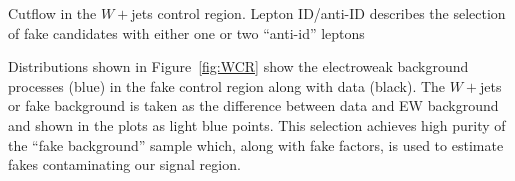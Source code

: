 \begin{table}[h!]
\scalebox{0.7}{

}
\caption{Cutflow in the $W+$jets control region. Lepton ID/anti-ID describes the selection of fake candidates with either one or two ``anti-id'' leptons}
\label{tab:fakescr}
\end{table}

Distributions shown in Figure~\ref{fig:WCR} show the electroweak background processes (blue) in the fake control region along with data (black). The $W+$jets or fake background is taken as the difference between data and EW background and shown in the plots as light blue points. This selection achieves high purity of the ``fake background'' sample which, along with fake factors, is used to estimate fakes contaminating our signal region.

\begin{figure}[!h]
  \hfill
  \hfill
  \hfill
\end{figure}
